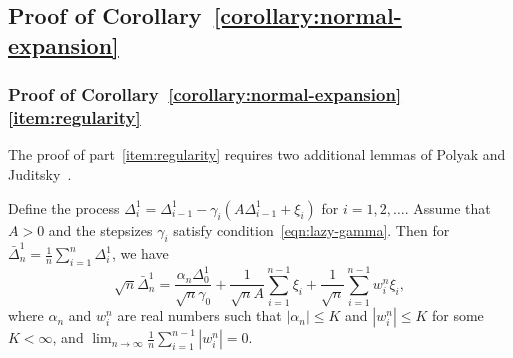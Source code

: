 

\subsection{Proof of Corollary~\ref{corollary:normal-expansion}}
\label{proof:normal-expansion}

\subsubsection*{Proof of
  Corollary~\ref{corollary:normal-expansion}\eqref{item:regularity}}

The proof of part~\eqref{item:regularity} requires two additional lemmas of
Polyak and Juditsky~\cite{PolyakJu92}.
\begin{lem}
  \label{lemma:polyak-expansion}
  Define the process $\Delta_i^1 = \Delta_{i-1}^1
  - \gamma_i (A \Delta_{i-1}^1 + \xi_i)$ for $i = 1, 2, \ldots$.
  Assume that $A>0$ and the stepsizes $\gamma_i$ satisfy
  condition~\eqref{eqn:lazy-gamma}. Then
  for $\bar{\Delta}_n^1 = \frac{1}{n} \sum_{i = 1}^n \Delta_i^1$, we have
  \begin{equation}
    \label{eqn:polyak-expansion}
    \sqrt{n} \bar{\Delta}_n^1
    = \frac{\alpha_n \Delta_0^1}{\sqrt{n} \gamma_0}
    + \frac{1}{\sqrt{n} A} \sum_{i=1}^{n-1} \xi_i
    + \frac{1}{\sqrt{n}}\sum_{i=1}^{n-1} w_i^n \xi_i,
  \end{equation}
  where $\alpha_n$ and $w_i^n$ are real numbers such that $|\alpha_n| \leq
  K$ and $|w_i^n|\leq K$ for some $K< \infty$, and $\lim_{n\to \infty}
  \frac{1}{n} \sum_{i=1}^{n-1} |w_i^n| = 0$.
\end{lem} 

